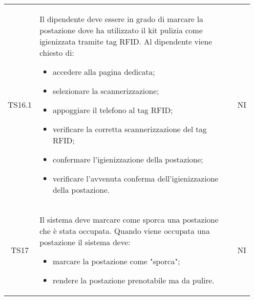 {\begin{longtable}{ c C{11cm} c }
        TS16.1&
        \begin{flushleft}
            Il dipendente deve essere in grado di marcare la postazione dove ha utilizzato il kit pulizia come igienizzata tramite tag RFID.
            Al dipendente viene chiesto di:
        \end{flushleft}
        \begin{itemize}
            \item accedere alla pagina dedicata;
            \item selezionare la scannerizzazione;
            \item appoggiare il telefono al tag RFID;
            \item verificare la corretta scannerizzazione del tag RFID;
            \item confermare l'igienizzazione della postazione;
            \item verificare l'avvenuta conferma dell'igienizzazione della postazione.
        \end{itemize}&
        NI\\

        TS17&
        \begin{flushleft}
            Il sistema deve marcare come sporca una postazione che \`{e} stata occupata.
            Quando viene occupata una postazione il sistema deve:
        \end{flushleft}
        \begin{itemize}
            \item marcare la postazione come "sporca";
            \item rendere la postazione prenotabile ma da pulire.
        \end{itemize}&
        NI\\

     
        
    \end{longtable}
}